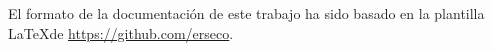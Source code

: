 \begin{center}

\vspace*{\fill}

El formato de la documentación de este trabajo ha sido basado en la plantilla \LaTeX\space de \href{https://github.com/erseco}{https://github.com/erseco}.

\end{center}
